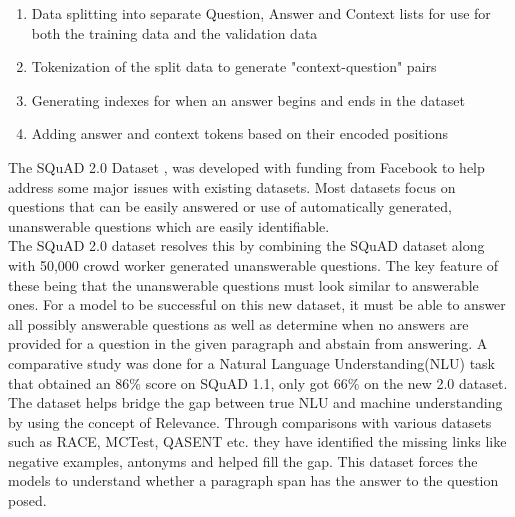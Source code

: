 \documentclass[a4paper,12pt]{report}
\begin{document}
	    \begin{enumerate}
	    	\item Data splitting into separate Question, Answer and Context lists for use for both the training data and the validation data
	    	\item Tokenization of the split data to generate "context-question" pairs
	    	\item Generating indexes for when an answer begins and ends in the dataset
	    	\item Adding answer and context tokens based on their encoded positions
	    \end{enumerate}

        The SQuAD 2.0 Dataset \citep{dataset}, was developed with funding from Facebook to help address some major issues with existing datasets. Most datasets focus on questions that can be easily answered or use of    automatically generated, unanswerable questions which are easily identifiable.\\
        The SQuAD 2.0 dataset resolves this by combining the SQuAD dataset along with 50,000 crowd worker generated unanswerable questions. The key feature of these being that the unanswerable questions must look similar to answerable ones. For a model to be successful on this new dataset, it must be able to answer all possibly answerable questions as well as determine when no answers are provided for a question in the given paragraph and abstain from answering. A comparative study was done for a Natural Language Understanding(NLU) task that obtained an 86\% score on SQuAD 1.1, only got 66\% on the new 2.0 dataset.
        The dataset helps bridge the gap between true NLU and machine understanding by using the concept of Relevance. Through comparisons with various datasets such as RACE, MCTest, QASENT etc. they have identified the missing links like negative examples, antonyms and helped fill the gap. This dataset forces the models to understand whether a paragraph span has the answer to the question posed.
\end{document}
